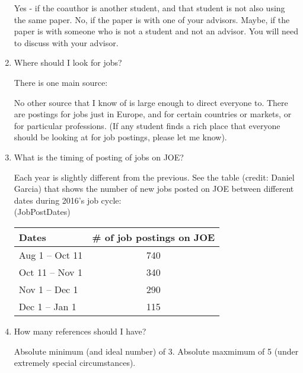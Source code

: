 \documentclass{econtex}
\providecommand\phantomsection{}
\begin{document}
\begin{enumerate}
  Yes - if the coauthor is another student, and that student is not
  also using the same paper.  No, if the paper is with one of your
  advisors.  Maybe, if the paper is with someone who is not a student
  and not an advisor.  You will need to discuss with your advisor.

\item Where should I look for jobs?

  There is one main source: \JOE

  No other source that I know of is large enough to direct everyone to. There are postings for jobs just in Europe, and for certain countries or markets, or for particular professions.  (If any student finds a rich place that everyone should be looking at for job postings, please let me know).

\item What is the timing of posting of jobs on JOE? 

  Each year is slightly different from the previous. See the table (credit: Daniel Garcia) 
 that shows the number of new jobs posted on JOE between different dates 
  during 2016's job cycle:\\

  \ifdvi\phantomsection\hypertarget{JobPostDates}{(JobPostDates)}\fi
  
\begin{table}[]
\centering
\begin{tabular}{|l|c|}
\hline
Dates                   & \# of job postings on JOE \\ \hline
Aug 1 -- Oct 11   & 740                       \\ \hline
Oct 11 -- Nov 1 & 340                       \\ \hline
Nov 1 -- Dec 1 & 290                       \\ \hline
Dec 1 -- Jan 1  & 115                       \\ \hline
\end{tabular}
\end{table}

\item How many references should I have?

Absolute minimum (and ideal number) of 3.  Absolute maxmimum of 5 (under
extremely special circumstances).  


\end{enumerate}
\end{document}
